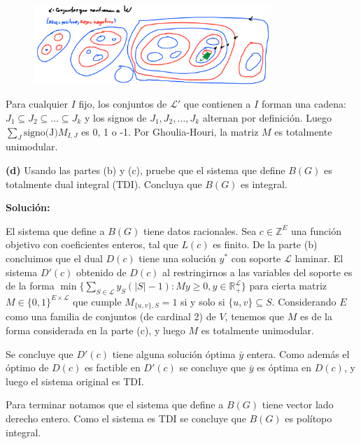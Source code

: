 \documentclass[10pt]{article}
\newcommand{\RR}{\mathbb R}
\newcommand{\ZZ}{\mathbb Z}
\theoremstyle{plain}
\theoremstyle{definition}
\begin{document}
\begin{figure}[h]
	\centering
	\includegraphics[width=0.8\textwidth]{laminar_set.png}
\end{figure}

Para cualquier $I$ fijo, los conjuntos de $\mathcal{L}'$ que contienen a $I$ forman una cadena:
$J_1\subseteq J_2\subseteq \dots \subseteq J_k$ y los signos de $J_1, J_2, \dots, J_k$ alternan por definición. Luego $\sum_{J}\text{signo(J)}M_{I,J}$ es 0, 1 o -1.
Por Ghoulia-Houri, la matriz $M$ es totalmente unimodular.

\hspace{-15pt}\textbf{(d)} Usando las partes (b) y (c), pruebe que el sistema que define $B(G)$ es totalmente dual integral (TDI). Concluya que $B(G)$ es integral.

\textbf{Solución:}

El sistema que define a $B(G)$ tiene datos racionales. Sea $c\in \ZZ^E$ una función objetivo con coeficientes enteros, tal que $L(c)$ es finito. De la parte (b) concluimos que el dual $D(c)$ tiene una solución $y^*$ con soporte $\mathcal{L}$ laminar. El sistema $D'(c)$ obtenido de $D(c)$ al restringirnos a las variables del soporte es de la forma $\min\{\sum_{S\in \mathcal{L}} y_S (|S|-1)\colon My\geq 0, y\in \RR^{\mathcal{L}}_+\}$ para cierta matriz $M\in \{0,1\}^{E\times \mathcal{L}}$ que cumple $M_{\{u,v\}, S}=1$ si y solo si $\{u,v\}\subseteq S$. Considerando $E$ como una familia de conjuntos (de cardinal 2) de $V$, tenemos que $M$ es de la forma considerada en la parte (c), y luego $M$ es totalmente unimodular.

Se concluye que $D'(c)$ tiene alguna solución óptima $\bar{y}$ entera. Como además el óptimo de $D(c)$ es factible en $D'(c)$ se concluye que $\bar{y}$ es óptima en $D(c)$, y luego el sistema original es TDI.

Para terminar notamos que el sistema que define a $B(G)$ tiene vector lado derecho entero. Como el sistema es TDI se concluye que $B(G)$ es polítopo integral.
\end{document}
